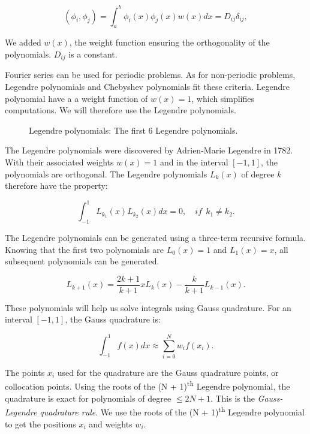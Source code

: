 \begin{equation}
	\left ( \phi_i, \phi_j \right ) = \int_a^b \phi_i(x)\phi_j(x)w(x)dx = D_{ij}\delta_{ij},
\end{equation}

We added $w(x)$, the weight function ensuring the orthogonality of the polynomials. $D_{ij}$ is a
constant. 

Fourier series can be used for periodic problems. As for non-periodic problems, Legendre polynomials
and Chebyshev polynomials fit these criteria. Legendre polynomial have a a weight function of $w(x)
= 1$, which simplifies computations. We will therefore use the Legendre polynomials.

\begin{figure}[H]
	\centering
	
	\caption{Legendre polynomials: The first 6 Legendre polynomials.}
	\label{fig:polynomials}
\end{figure}

The Legendre polynomials were discovered by Adrien-Marie Legendre in 1782. With their associated
weights $w(x) = 1$ and in the interval $\left[ -1, 1 \right]$, the polynomials are orthogonal. The
Legendre polynomials $L_k \left( x \right)$ of degree $k$ therefore have the property:

\begin{equation}
	\int_{-1}^{1}L_{k_1}(x) L_{k_2}(x) dx = 0, \quad if \:\: k_1 \neq k_2. 
\end{equation}

The Legendre polynomials can be generated using a three-term recursive formula. Knowing that the
first two polynomials are $L_0 \left( x \right) = 1$ and $L_1 \left( x \right) = x$, all subsequent
polynomials can be generated.

\begin{equation} \label{equ:three_terms}
	L_{k + 1}(x) = \frac{2k + 1}{k + 1}xL_k(x) - \frac{k}{k + 1}L_{k - 1}(x).
\end{equation}

These polynomials will help us solve integrals using Gauss quadrature. For an interval $\left[ -1, 1
\right]$, the Gauss quadrature is:

\begin{equation}
	\int_{-1}^{1}f(x)dx \approx \sum_{i = 0}^{N}w_i f(x_i). 
\end{equation}

The points $x_i$ used for the quadrature are the Gauss quadrature points, or collocation points.
Using the roots of the (N + 1)\textsuperscript{th} Legendre polynomial, the quadrature is exact for
polynomials of degree $\leq 2 N + 1$. This is the \textit{Gauss-Legendre quadrature rule}. We use
the roots of the (N + 1)\textsuperscript{th} Legendre polynomial to get the positions $x_i$ and
weights $w_i$.

